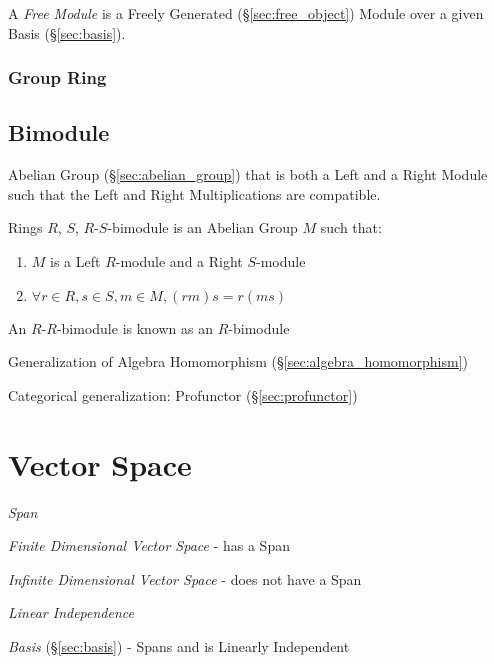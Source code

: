 A \emph{Free Module} is a Freely Generated (\S\ref{sec:free_object})
Module over a given Basis (\S\ref{sec:basis}).



\subsubsection{Group Ring}\label{sec:group_ring}



\subsection{Bimodule}\label{sec:bimodule}

Abelian Group (\S\ref{sec:abelian_group}) that is both a Left and a
Right Module such that the Left and Right Multiplications are
compatible.

Rings $R$, $S$, $R$-$S$-bimodule is an Abelian Group $M$ such that:

\begin{enumerate}
\item $M$ is a Left $R$-module and a Right $S$-module
\item $\forall r \in R, s \in S, m \in M, (rm)s = r(ms)$
\end{enumerate}

An $R$-$R$-bimodule is known as an $R$-bimodule

Generalization of Algebra Homomorphism
(\S\ref{sec:algebra_homomorphism})

Categorical generalization: Profunctor (\S\ref{sec:profunctor})



\section{Vector Space}\label{sec:vector_space}

\emph{Span}

\emph{Finite Dimensional Vector Space} - has a Span

\emph{Infinite Dimensional Vector Space} - does not have a Span

\emph{Linear Independence}

\emph{Basis} (\S\ref{sec:basis}) - Spans and is Linearly Independent

